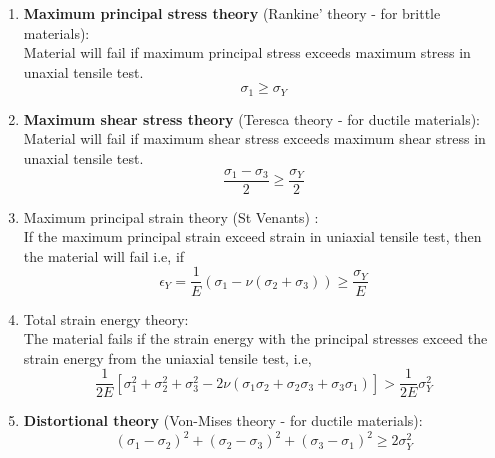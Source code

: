\documentclass{article}
\begin{document}
			\begin{enumerate}
				\item \textbf{Maximum principal stress theory} (Rankine' theory - for brittle materials): \\
					Material will fail if maximum principal stress exceeds maximum stress in unaxial tensile test.
					\[\boxed{\sigma_1 \geq \sigma_Y}\]
				\item \textbf{Maximum shear stress theory} (Teresca theory - for ductile materials): \\
					Material will fail if maximum shear stress exceeds maximum shear stress in unaxial tensile test.
					\[\boxed{\frac{\sigma_1 - \sigma_3}{2} \geq \frac{\sigma_Y}{2}}\]

				\item Maximum principal strain theory (St Venants) :\\
				If the maximum principal strain exceed strain in uniaxial tensile test, then the material will fail i.e, if
				\[\epsilon_Y = \frac{1}{E}(\sigma_1 - \nu (\sigma_2 +\sigma_3)) \geq \frac{\sigma_Y}{E}\]

				\item Total strain energy theory:\\
					The material fails if the strain energy with the principal stresses exceed the strain energy from the uniaxial tensile test, i.e, 
				\[\frac{1}{2E}[\sigma_1^2 + \sigma_2^2 + \sigma_3^2 - 2\nu(\sigma_1 \sigma_2 + \sigma_2 \sigma_3 + \sigma_3 \sigma_1)] > \frac{1}{2E} \sigma_Y^2\]

				\item \textbf{Distortional theory }(Von-Mises theory - for ductile materials):\\
					 \[\boxed{(\sigma_1-\sigma_2)^2 + (\sigma_2 -\sigma_3)^2 + (\sigma_3-\sigma_1)^2 \geq 2 \sigma_Y^2}\]
			\end{enumerate}
\end{document}

